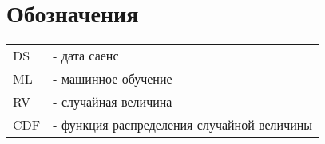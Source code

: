 \chapter*{Обозначения}

\begin{tabular}{ l l }
 DS & - дата саенс \\ 
 ML & - машинное обучение \\ 
 RV & - случайная величина \\
 CDF & - функция распределения случайной величины 
\end{tabular}
